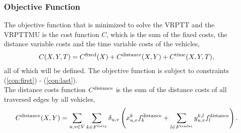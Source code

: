 \subsubsection{Objective Function}

The objective function that is minimized to solve the VRPTT and the VRPTTMU is the cost function $C$, which is the sum of the fixed costs, the distance variable costs and the time variable costs of the vehicles,
\begin{align}
   C(X,Y,T) = C^{\rm fixed}(X) + C^{\rm distance}(X,Y) + C^{\rm time}(X,Y,T),
\end{align}
all of which will be defined. The objective function is subject to constraints (\ref{con:first}) - (\ref{con:last}). \\

The distance costs function $C^{\rm distance}$ is the sum of the distance costs of all traversed edges by all vehicles,
\begin{align}
   C^{\rm distance}(X,Y) =
   \sum_{u,v \in V}
   \sum_{k \in F^{\rm lorry}}
   \delta_{u,v}
   \left(
   x^k_{u,v}  f_k^{\rm distance}
   +
   \sum_{l \in F^{\rm trailer}}
   y^{k,l}_{u,v}  f_l^{\rm distance}
   \right) .
\end{align}


%
%
%
%
%
%
%

